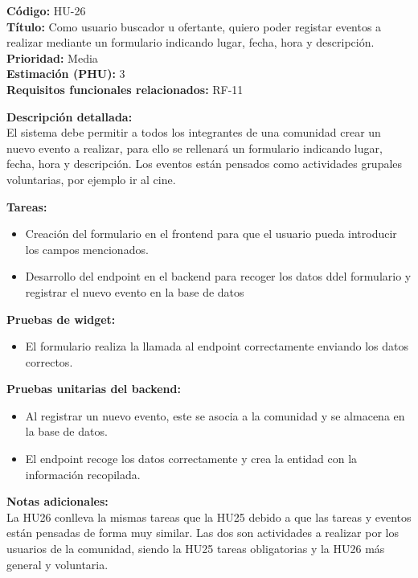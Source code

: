 \begin{tarjetaHU}
\textbf{Código:} HU-26 \\
\textbf{Título:} Como usuario buscador u ofertante, quiero poder registar eventos a realizar mediante un formulario indicando lugar, fecha, hora y descripción. \\
\textbf{Prioridad:} Media \\
\textbf{Estimación (PHU):} 3 \\
\textbf{Requisitos funcionales relacionados:} RF-11

\vspace{0.5em}
\textbf{Descripción detallada:} \\
El sistema debe permitir a todos los integrantes de una comunidad crear un nuevo evento a realizar, para ello se rellenará un formulario indicando lugar, fecha, hora y descripción. Los eventos están pensados como actividades grupales voluntarias, por ejemplo ir al cine.

\vspace{0.5em}
\textbf{Tareas:}
\begin{itemize}[left=0pt]
  \item Creación del formulario en el frontend para que el usuario pueda introducir los campos mencionados.
  \item Desarrollo del endpoint en el backend para recoger los datos ddel formulario y registrar el nuevo evento en la base de datos
\end{itemize}

\vspace{0.5em}
\textbf{Pruebas de widget:}
\begin{itemize}[left=0pt]
  \item El formulario realiza la llamada al endpoint correctamente enviando los datos correctos.
\end{itemize}
\textbf{Pruebas unitarias del backend:}
\begin{itemize}[left=0pt]
  \item Al registrar un nuevo evento, este se asocia a la comunidad y se almacena en la base de datos.
  \item El endpoint recoge los datos correctamente y crea la entidad con la información recopilada.
\end{itemize}
\textbf{Notas adicionales:} \\
La HU26 conlleva la mismas tareas que la HU25 debido a que las tareas y eventos están pensadas de forma muy similar. Las dos son actividades a realizar por los usuarios de la comunidad, siendo la HU25 tareas obligatorias y la HU26 más general y voluntaria.

\end{tarjetaHU}

